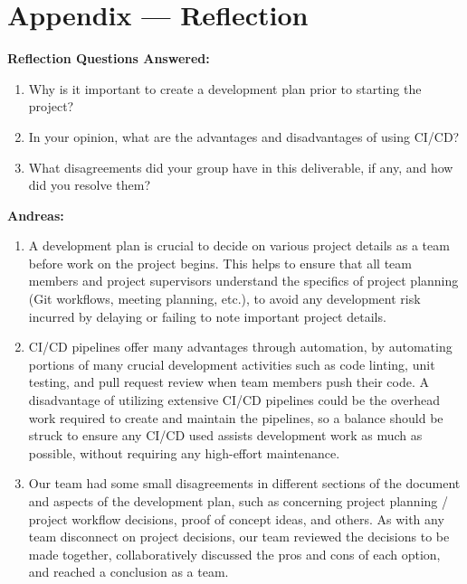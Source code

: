 \documentclass{article}
\begin{document}
\newpage{}

\section*{Appendix --- Reflection}

\noindent \textbf{Reflection Questions Answered:}

\begin{enumerate}
    \item Why is it important to create a development plan prior to starting the
    project?
    \item In your opinion, what are the advantages and disadvantages of using
    CI/CD?
    \item What disagreements did your group have in this deliverable, if any,
    and how did you resolve them?
\end{enumerate}

\noindent \textbf{Andreas:}

\begin{enumerate}
	\item A development plan is crucial to decide on various project details as 
	a team before work on the project begins. This helps to ensure that all 
	team members and project supervisors understand the specifics of project 
	planning (Git workflows, meeting planning, etc.), to avoid any development 
	risk incurred by delaying or failing to note important project details.
	\item CI/CD pipelines offer many advantages through automation, by 
	automating portions of many crucial development activities such as code 
	linting, unit testing, and pull request review when team members push their 
	code. A disadvantage of utilizing extensive CI/CD pipelines could be the 
	overhead work required to create and maintain the pipelines, so a balance 
	should be struck to ensure any CI/CD used assists development work as much 
	as possible, without requiring any high-effort maintenance.
	\item Our team had some small disagreements in different sections of the 
	document and aspects of the development plan, such as concerning project 
	planning / project workflow decisions, proof of concept ideas, and others. 
	As with any team disconnect on project decisions, our team reviewed the 
	decisions to be made together, collaboratively discussed the pros and 
	cons of each option, and reached a conclusion as a team.
\end{enumerate}
\end{document}
